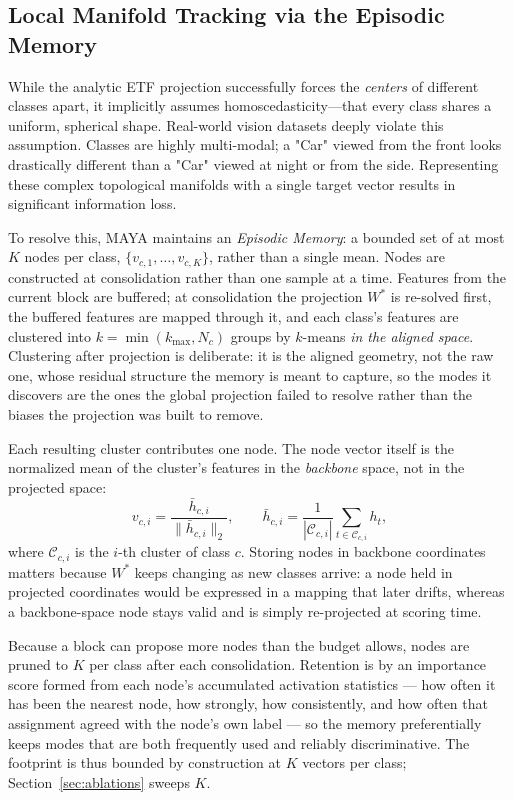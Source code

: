 \subsection{Local Manifold Tracking via the Episodic Memory}
\label{sec:method_nodes}
While the analytic ETF projection successfully forces the \textit{centers} of different classes apart, it implicitly assumes homoscedasticity---that every class shares a uniform, spherical shape. Real-world vision datasets deeply violate this assumption. Classes are highly multi-modal; a "Car" viewed from the front looks drastically different than a "Car" viewed at night or from the side. Representing these complex topological manifolds with a single target vector results in significant information loss.

To resolve this, MAYA maintains an \textit{Episodic Memory}: a bounded set of at most $K$ nodes per class, $\{v_{c,1}, \dots, v_{c,K}\}$, rather than a single mean. Nodes are constructed at consolidation rather than one sample at a time. Features from the current block are buffered; at consolidation the projection $W^*$ is re-solved first, the buffered features are mapped through it, and each class's features are clustered into $k = \min(k_{\max}, N_c)$ groups by $k$-means \emph{in the aligned space}. Clustering after projection is deliberate: it is the aligned geometry, not the raw one, whose residual structure the memory is meant to capture, so the modes it discovers are the ones the global projection failed to resolve rather than the biases the projection was built to remove.

Each resulting cluster contributes one node. The node vector itself is the normalized mean of the cluster's features in the \emph{backbone} space, not in the projected space:
\begin{equation}
    v_{c,i} = \frac{\bar{h}_{c,i}}{\|\bar{h}_{c,i}\|_2},
    \qquad
    \bar{h}_{c,i} = \frac{1}{|\mathcal{C}_{c,i}|} \sum_{t \in \mathcal{C}_{c,i}} h_t ,
    \label{eq:node_update}
\end{equation}
where $\mathcal{C}_{c,i}$ is the $i$-th cluster of class $c$. Storing nodes in backbone coordinates matters because $W^*$ keeps changing as new classes arrive: a node held in projected coordinates would be expressed in a mapping that later drifts, whereas a backbone-space node stays valid and is simply re-projected at scoring time.

Because a block can propose more nodes than the budget allows, nodes are pruned to $K$ per class after each consolidation. Retention is by an importance score formed from each node's accumulated activation statistics --- how often it has been the nearest node, how strongly, how consistently, and how often that assignment agreed with the node's own label --- so the memory preferentially keeps modes that are both frequently used and reliably discriminative. The footprint is thus bounded by construction at $K$ vectors per class; Section~\ref{sec:ablations} sweeps $K$.

